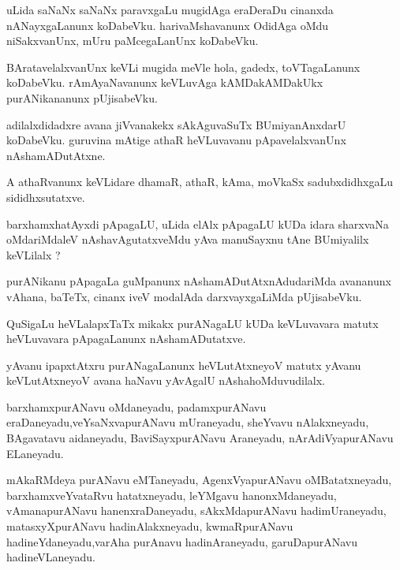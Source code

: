 \documentclass{article}
\begin{document}
\begin{mn}
uLida  saNaNx saNaNx  paravxgaLu  mugidAga  eraDeraDu  cinanxda  nANayxgaLanunx  koDabeVku.  
harivaMshavanunx  OdidAga  oMdu  niSakxvanUnx,  mUru  paMcegaLanUnx  koDabeVku.
\end{mn}

\begin{mn}
BAratavelalxvanUnx  keVLi  mugida  meVle  hola,  gadedx,  toVTagaLanunx  koDabeVku.  rAmAyaNavanunx  
keVLuvAga  kAMDakAMDakUkx  purANikananunx  pUjisabeVku.
\end{mn}

\begin{mn}
adilalxdidadxre  avana  jiVvanakekx  sAkAguvaSuTx  BUmiyanAnxdarU  koDabeVku.  guruvina  mAtige  
athaR  heVLuvavanu  pApavelalxvanUnx  nAshamADutAtxne.
\end{mn}

\begin{mn}
A  athaRvanunx  keVLidare  dhamaR,  athaR,  kAma,  moVkaSx  sadubxdidhxgaLu  sididhxsutatxve.
\end{mn}

\begin{mn}
barxhamxhatAyxdi  pApagaLU,  uLida  elAlx  pApagaLU  kUDa  idara  sharxvaNa  oMdariMdaleV 
nAshavAgutatxveMdu  yAva  manuSayxnu  tAne  BUmiyalilx  keVLilalx ?
\end{mn}

\begin{mn}
purANikanu  pApagaLa  guMpanunx  nAshamADutAtxnAdudariMda  avananunx  vAhana,  baTeTx,  cinanx  
iveV  modalAda  darxvayxgaLiMda  pUjisabeVku.
\end{mn}

\begin{mn}
QuSigaLu  heVLalapxTaTx  mikakx  purANagaLU  kUDa  keVLuvavara  matutx  heVLuvavara  pApagaLanunx  nAshamADutatxve.
\end{mn}

\begin{mn}
yAvanu  ipapxtAtxru  purANagaLanunx  heVLutAtxneyoV  matutx  yAvanu  keVLutAtxneyoV  avana  haNavu 
yAvAgalU  nAshahoMduvudilalx.
\end{mn}

\begin{mn}
barxhamxpurANavu  oMdaneyadu,  padamxpurANavu  eraDaneyadu,veYsaNxvapurANavu  mUraneyadu,  sheYvavu  
nAlakxneyadu,  BAgavatavu  aidaneyadu,  BaviSayxpurANavu Araneyadu,  nArAdiVyapurANavu  ELaneyadu.
\end{mn}

\begin{mn}
mAkaRMdeya purANavu  eMTaneyadu,  AgenxVyapurANavu  oMBatatxneyadu,  barxhamxveYvataRvu  hatatxneyadu,  
leYMgavu  hanonxMdaneyadu,  vAmanapurANavu  hanenxraDaneyadu,  sAkxMdapurANavu  hadimUraneyadu,  
matasxyXpurANavu  hadinAlakxneyadu,  kwmaRpurANavu  hadineYdaneyadu,varAha purAnavu  hadinAraneyadu,  
garuDapurANavu  hadineVLaneyadu.
\end{mn}
\end{document}
